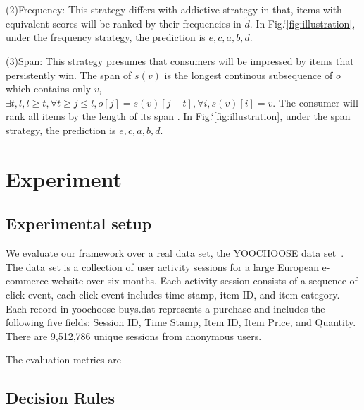 \documentclass[sigconf]{acmart}
\begin{document}
(2)Frequency: This strategy differs with addictive strategy in that, items with equivalent scores will be ranked by their frequencies in $\tilde{d}$. In Fig.`\ref{fig:illustration},  under the frequency strategy, the prediction is $e,c,a,b,d$.

(3)Span: This strategy presumes that consumers will be impressed by items that persistently win. The span of $s(v)$ is the longest continous subsequence of $o$ which contains only $v$, $\exists t,l, l\geq t, \forall t\geq j\leq l, o[j]=s(v)[j-t], \forall i, s(v)[i]=v$. The consumer will rank all items by the length of its span . In Fig.`\ref{fig:illustration}, under the span strategy, the prediction is $e,c,a,b,d$.


\section{Experiment}\label{sec:experiment}


\subsection{Experimental setup}


We evaluate our framework over a real data set, the YOOCHOOSE data set~\cite{Ben-Shimon2015RecSys}. The data set is a collection of user activity sessions for a large
European e-commerce website over six months. Each activity session consists of a sequence of click event, each click event includes time stamp, item ID, and item category. Each
record in yoochoose-buys.dat represents a purchase and includes
the following five fields: Session ID, Time Stamp, Item ID, Item
Price, and Quantity. There are 9,512,786 unique sessions from anonymous users.


The evaluation metrics are




\subsection{Decision Rules}
\end{document}
